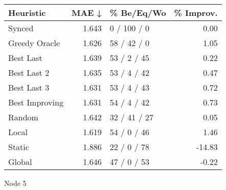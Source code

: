 \begin{tabular}{lrlr}
\toprule
\textbf{Heuristic} & \textbf{MAE ↓} & \textbf{\% Be/Eq/Wo} & \textbf{\% Improv.} \\
\midrule
            Synced &          1.643 &          0 / 100 / 0 &                0.00 \\
     Greedy Oracle &          1.626 &          58 / 42 / 0 &                1.05 \\
         Best Last &          1.639 &          53 / 2 / 45 &                0.22 \\
       Best Last 2 &          1.635 &          53 / 4 / 42 &                0.47 \\
       Best Last 3 &          1.631 &          53 / 4 / 43 &                0.72 \\
    Best Improving &          1.631 &          54 / 4 / 42 &                0.73 \\
            Random &          1.642 &         32 / 41 / 27 &                0.05 \\
             Local &          1.619 &          54 / 0 / 46 &                1.46 \\
            Static &          1.886 &          22 / 0 / 78 &              -14.83 \\
            Global &          1.646 &          47 / 0 / 53 &               -0.22 \\
\bottomrule
\end{tabular}
\caption{Node 5}
\label{tab:ds_non_lr01_le1_bs2_5}
